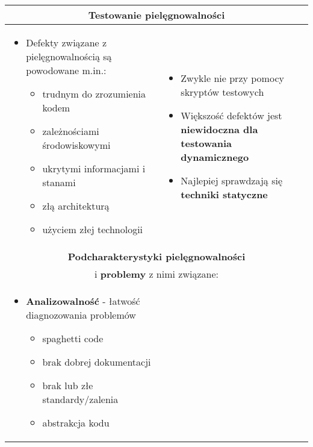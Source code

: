 \documentclass[../main.tex]{subfiles}
\begin{document}
    \begin{table}[H]
        \begin{center}
            \begin{tabular}{| p{8cm} | p{8cm} |}
                \hline
                \multicolumn{2}{|c|}{\textbf{Testowanie pielęgnowalności}}\\
                \hline
                \begin{itemize}
                    \item Defekty związane z pielęgnowalnością są powodowane m.in.:
                    \begin{itemize}
                        \item trudnym do zrozumienia kodem
                        \item zależnościami środowiskowymi
                        \item ukrytymi informacjami i stanami
                        \item złą architekturą
                        \item użyciem złej technologii
                    \end{itemize}
                \end{itemize}
                &
                \begin{itemize}
                    \item Zwykle nie przy pomocy skryptów testowych
                    \item Większość defektów jest \textbf{niewidoczna dla testowania dynamicznego}
                    \item Najlepiej sprawdzają się \textbf{techniki statyczne}
                \end{itemize}\\
                \hline
                \hline
                \multicolumn{2}{|c|}{\textbf{Podcharakterystyki pielęgnowalności}}\\
                \multicolumn{2}{|c|}{i \textbf{problemy} z nimi związane:}\\
                \hline
                \begin{itemize}
                    \item \textbf{Analizowalność} - łatwość diagnozowania problemów
                    \begin{itemize}
                        \item spaghetti code
                        \item brak dobrej dokumentacji
                        \item brak lub złe standardy/zalenia
                        \item abstrakcja kodu
                    \end{itemize}


\end{itemize}
\end{tabular}
\end{center}
\end{table}
\end{document}
